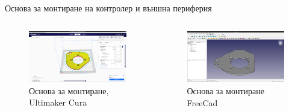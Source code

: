\documentclass{beamer}
\begin{document}
\begin{frame}{Основа за монтиране на контролер и външна периферия}
	\begin{columns}
		\pause
		\begin{figure}[htpb!]
		\centering
		\includegraphics[width=1\textwidth]{Images/ultimaker_cura_window.png}
		\caption{Основа за монтиране, Ultimaker Cura}
	\end{figure}


	\pause
	\begin{figure}[htpb!]
		\centering
		\includegraphics[width=1\textwidth]{Images/freecad_window.png}
		\caption{Основа за монтиране FreeCad}
	\end{figure}
\end{columns}

\end{frame}
\end{document}
